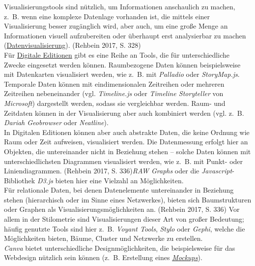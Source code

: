 \documentclass{article}
\begin{document}
    Visualisierungstools sind nützlich, um Informationen anschaulich zu machen, z. B. wenn eine komplexe Datenlage vorhanden ist, die mittels einer Visualisierung besser zugänglich wird, aber auch, um eine große Menge an Informationen visuell aufzubereiten oder überhaupt erst analysierbar zu machen (\href{http://gams.uni-graz.at/o:konde.54}{Datenvisualisierung}). (Rehbein 2017, S. 328)\\
            
        Für \href{http://gams.uni-graz.at/o:konde.59}{Digitale Editionen} gibt es eine Reihe an Tools, die für unterschiedliche Zwecke eingesetzt werden können. Raumbezogene Daten können beispielsweise mit Datenkarten visualisiert werden, wie z. B. mit \emph{Palladio} oder \emph{StoryMap.js}. Temporale Daten können mit eindimensionalen Zeitreihen oder mehreren Zeitreihen nebeneinander (vgl. \emph{Timeline.js} oder \emph{Timeline Storyteller} von \emph{Microsoft}) dargestellt werden, sodass sie vergleichbar werden. Raum- und Zeitdaten können in der Visualisierung aber auch kombiniert werden (vgl. z. B. \emph{Dariah Geobrowser} oder \emph{Neatline}). \\
            
        In Digitalen Editionen können aber auch abstrakte Daten, die keine Ordnung wie Raum oder Zeit aufweisen, visualisiert werden. Die Datenmessung erfolgt hier an Objekten, die untereinander nicht in Beziehung stehen –  solche Daten können mit unterschiedlichsten Diagrammen visualisiert werden, wie z. B. mit Punkt- oder Liniendiagrammen. (Rehbein 2017, S. 336)\emph{RAW Graphs} oder die \emph{Javascript}-Bibliothek \emph{D3.js} bieten hier eine Vielzahl an Möglichkeiten.\\
            
        Für relationale Daten, bei denen Datenelemente untereinander in Beziehung stehen (hierarchisch oder im Sinne eines Netzwerkes), bieten sich Baumstrukturen oder Graphen als Visualisierungsmöglichkeiten an. (Rehbein 2017, S. 336) Vor allem in der Stilometrie sind Visualisierungen dieser Art von großer Bedeutung; häufig genutzte Tools sind hier z. B. \emph{Voyant Tools}, \emph{Stylo} oder \emph{Gephi}, welche die Möglichkeiten bieten, Bäume, Cluster und Netzwerke zu erstellen.\\
            
        \emph{Canva} bietet unterschiedliche Designmöglichkeiten, die beispielsweise für das Webdesign nützlich sein können (z. B. Erstellung eines \emph{\href{http://gams.uni-graz.at/o:konde.135}{Mockups}}).\\
            
\end{document}
